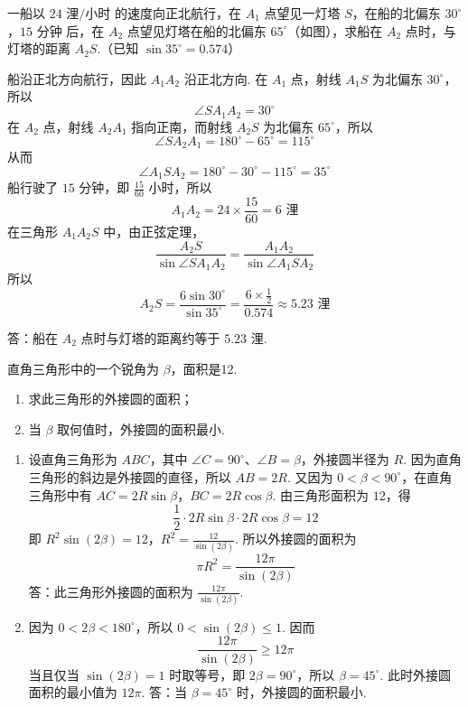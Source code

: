 \begin{problem}
一船以 \(24\text{~浬/小时}\) 的速度向正北航行，在 \(A_1\) 点望见一灯塔 \(S\)，在船的北偏东 \(30^\circ\)，\(15\text{~分钟}\) 后，在 \(A_2\) 点望见灯塔在船的北偏东 \(65^\circ\)（如图），求船在 \(A_2\) 点时，与灯塔的距离 \(A_2S\).（已知 \(\sin35^\circ=0.574\)）

\end{problem}

\begin{solution}
船沿正北方向航行，因此 \(A_1A_2\) 沿正北方向. 在 \(A_1\) 点，射线 \(A_1S\) 为北偏东 \(30^\circ\)，所以
\[
\angle SA_1A_2=30^\circ
\]
在 \(A_2\) 点，射线 \(A_2A_1\) 指向正南，而射线 \(A_2S\) 为北偏东 \(65^\circ\)，所以
\[
\angle SA_2A_1=180^\circ-65^\circ=115^\circ
\]
从而
\[
\angle A_1SA_2=180^\circ-30^\circ-115^\circ=35^\circ
\]
船行驶了 \(15\) 分钟，即 \(\frac{15}{60}\) 小时，所以
\[
A_1A_2=24\times\frac{15}{60}=6\text{~浬}
\]
在三角形 \(A_1A_2S\) 中，由正弦定理，
\[
\frac{A_2S}{\sin\angle SA_1A_2}
=\frac{A_1A_2}{\sin\angle A_1SA_2}
\]
所以
\[
A_2S=\frac{6\sin30^\circ}{\sin35^\circ}
=\frac{6\times\frac{1}{2}}{0.574}
\approx5.23\text{~浬}
\]

答：船在 \(A_2\) 点时与灯塔的距离约等于 \(5.23\text{~浬}\).
\end{solution}

\begin{problem}
直角三角形中的一个锐角为 \(\beta\)，面积是12.

\begin{enumerate}
\item 求此三角形的外接圆的面积；

\item 当 \(\beta\) 取何值时，外接圆的面积最小.
\end{enumerate}

\end{problem}

\begin{solution}
\begin{enumerate}
\item 设直角三角形为 \(ABC\)，其中 \(\angle C=90^\circ\)、\(\angle B=\beta\)，外接圆半径为 \(R\). 因为直角三角形的斜边是外接圆的直径，所以 \(AB=2R\). 又因为 \(0<\beta<90^\circ\)，在直角三角形中有
\(AC=2R\sin\beta\)，\(BC=2R\cos\beta\).
由三角形面积为 \(12\)，得
\[
\frac{1}{2}\cdot2R\sin\beta\cdot2R\cos\beta=12
\]
即
\(R^2\sin\left(2\beta\right)=12\)，\(R^2=\frac{12}{\sin\left(2\beta\right)}\).
所以外接圆的面积为
\[
\pi R^2=\frac{12\pi}{\sin\left(2\beta\right)}
\]
答：此三角形外接圆的面积为 \(\frac{12\pi}{\sin\left(2\beta\right)}\).

\item 因为 \(0<2\beta<180^\circ\)，所以 \(0<\sin\left(2\beta\right)\leqslant1\). 因而
\[
\frac{12\pi}{\sin\left(2\beta\right)}\geqslant12\pi
\]
当且仅当 \(\sin\left(2\beta\right)=1\) 时取等号，即 \(2\beta=90^\circ\)，所以 \(\beta=45^\circ\). 此时外接圆面积的最小值为 \(12\pi\). 答：当 \(\beta=45^\circ\) 时，外接圆的面积最小.

\end{enumerate}
\end{solution}

